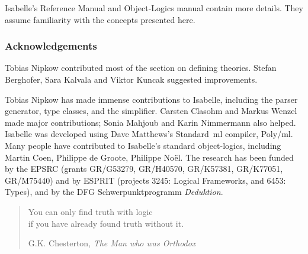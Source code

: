 \documentclass[12pt,a4paper]{article}
\begin{document}
Isabelle's Reference Manual and Object-Logics manual contain more details.
They assume familiarity with the concepts presented here.


\subsubsection*{Acknowledgements} 
Tobias Nipkow contributed most of the section on defining theories.
Stefan Berghofer, Sara Kalvala and Viktor Kuncak suggested improvements.

Tobias Nipkow has made immense contributions to Isabelle, including the parser
generator, type classes, and the simplifier.  Carsten Clasohm and Markus
Wenzel made major contributions; Sonia Mahjoub and Karin Nimmermann also
helped.  Isabelle was developed using Dave Matthews's Standard~{\sc ml}
compiler, Poly/{\sc ml}.  Many people have contributed to Isabelle's standard
object-logics, including Martin Coen, Philippe de Groote, Philippe No\"el.
The research has been funded by the EPSRC (grants GR/G53279, GR/H40570,
GR/K57381, GR/K77051, GR/M75440) and by ESPRIT (projects 3245: Logical
Frameworks, and 6453: Types), and by the DFG Schwerpunktprogramm
\emph{Deduktion}.

\newpage
\pagestyle{plain} \tableofcontents 
\newpage

\vspace*{2.5cm}
\begin{quote}
\raggedleft
{\sanssi
You can only find truth with logic\\
if you have already found truth without it.}\\
\bigskip

G.K. Chesterton, {\em The Man who was Orthodox}
\end{quote}

\clearfirst  \pagestyle{headings}




 \small\raggedright\frenchspacing


\printindex
\end{document}
